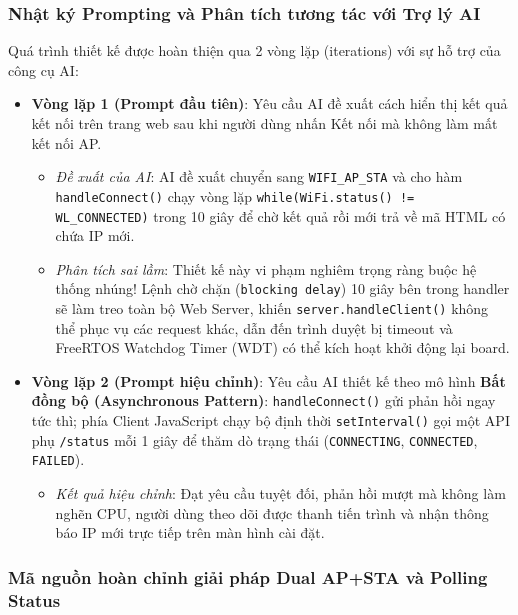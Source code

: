 \subsubsection{Nhật ký Prompting và Phân tích tương tác với Trợ lý AI}
Quá trình thiết kế được hoàn thiện qua 2 vòng lặp (iterations) với sự hỗ trợ của công cụ AI:
\begin{itemize}
    \item \textbf{Vòng lặp 1 (Prompt đầu tiên)}: Yêu cầu AI đề xuất cách hiển thị kết quả kết nối trên trang web sau khi người dùng nhấn Kết nối mà không làm mất kết nối AP.
    \begin{itemize}
        \item \textit{Đề xuất của AI}: AI đề xuất chuyển sang \texttt{WIFI\_AP\_STA} và cho hàm \texttt{handleConnect()} chạy vòng lặp \texttt{while(WiFi.status() != WL\_CONNECTED)} trong 10 giây để chờ kết quả rồi mới trả về mã HTML có chứa IP mới.
        \item \textit{Phân tích sai lầm}: Thiết kế này vi phạm nghiêm trọng ràng buộc hệ thống nhúng! Lệnh chờ chặn (\texttt{blocking delay}) 10 giây bên trong handler sẽ làm treo toàn bộ Web Server, khiến \texttt{server.handleClient()} không thể phục vụ các request khác, dẫn đến trình duyệt bị timeout và FreeRTOS Watchdog Timer (WDT) có thể kích hoạt khởi động lại board.
    \end{itemize}
    \item \textbf{Vòng lặp 2 (Prompt hiệu chỉnh)}: Yêu cầu AI thiết kế theo mô hình \textbf{Bất đồng bộ (Asynchronous Pattern)}: \texttt{handleConnect()} gửi phản hồi ngay tức thì; phía Client JavaScript chạy bộ định thời \texttt{setInterval()} gọi một API phụ \texttt{/status} mỗi 1 giây để thăm dò trạng thái (\texttt{CONNECTING}, \texttt{CONNECTED}, \texttt{FAILED}).
    \begin{itemize}
        \item \textit{Kết quả hiệu chỉnh}: Đạt yêu cầu tuyệt đối, phản hồi mượt mà không làm nghẽn CPU, người dùng theo dõi được thanh tiến trình và nhận thông báo IP mới trực tiếp trên màn hình cài đặt.
    \end{itemize}
\end{itemize}

\subsubsection{Mã nguồn hoàn chỉnh giải pháp Dual AP+STA và Polling Status}

